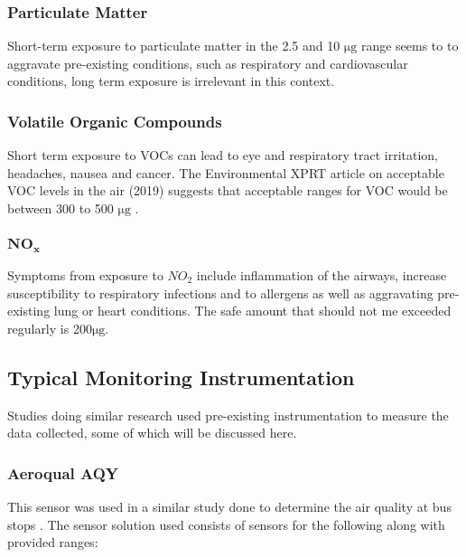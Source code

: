 \pagebreak

\subsubsection{Particulate Matter }
Short-term exposure to particulate matter in the 2.5 and 10 $ \si{\micro\gram} $ range seems to to aggravate pre-existing conditions, such as respiratory and cardiovascular conditions\cite{pmparticles}, long term exposure is irrelevant in this context.





\subsubsection{Volatile Organic Compounds}
Short term exposure to VOCs can lead to eye and respiratory tract irritation, headaches, nausea and cancer\cite{safevocs}.
The Environmental XPRT article on acceptable VOC levels in the air (2019) \cite{vocs} suggests that acceptable ranges for VOC would be between 300 to 500 $ \si{\micro\gram} $ .

\subsubsection{$\mathbf{NO_x}$}
Symptoms from exposure to $NO_2$ include inflammation of the airways, increase susceptibility to respiratory infections and to allergens as well as aggravating pre-existing lung or heart conditions. The safe amount that should not me exceeded regularly is 200$ \si{\micro\gram} $.\cite{safenox}


\subsection{Typical Monitoring Instrumentation}
Studies doing similar research used pre-existing instrumentation to measure the data collected, some of which will be discussed here.

\subsubsection{Aeroqual AQY}
This sensor was used in a similar study done to determine the air quality at bus stops \cite{busstop}. 
The sensor solution used consists of sensors for the following along with provided ranges\cite{sensoraq}:

